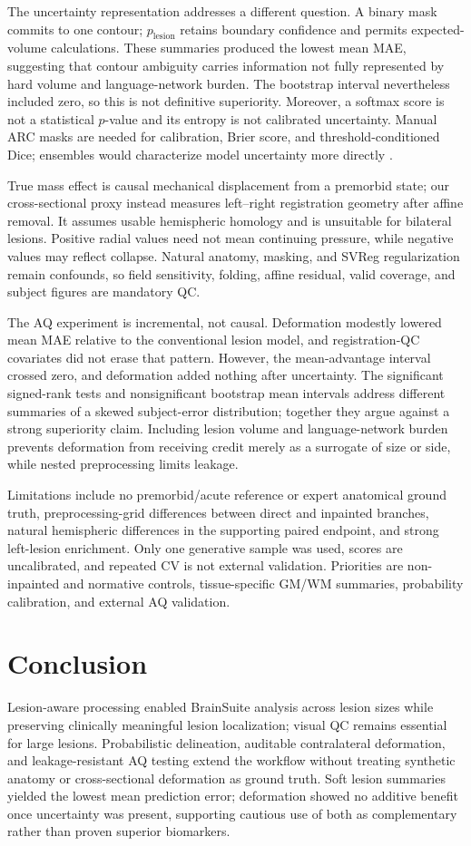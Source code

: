 \documentclass[runningheads]{llncs}
\newcommand{\plesion}{p_{\mathrm{lesion}}}
\begin{document}
The uncertainty representation addresses a different question. A binary mask
commits to one contour; $\plesion$ retains boundary confidence and permits
expected-volume calculations. These summaries produced the lowest mean MAE,
suggesting that contour ambiguity carries information not fully represented by
hard volume and language-network burden. The bootstrap interval nevertheless
included zero, so this is not definitive superiority. Moreover, a softmax score
is not a statistical $p$-value and its entropy is not calibrated uncertainty.
Manual ARC masks are needed for calibration, Brier score, and
threshold-conditioned Dice; ensembles would characterize model uncertainty
more directly \cite{Mehrtash2020}.

True mass effect is causal mechanical displacement from a premorbid state; our
cross-sectional proxy instead measures left--right registration geometry after
affine removal. It assumes usable hemispheric homology and is unsuitable for
bilateral lesions. Positive radial values need not mean continuing pressure,
while negative values may reflect collapse. Natural anatomy, masking, and SVReg
regularization remain confounds, so field sensitivity, folding, affine residual,
valid coverage, and subject figures are mandatory QC.

The AQ experiment is incremental, not causal. Deformation modestly lowered mean
MAE relative to the conventional lesion model, and registration-QC covariates
did not erase that pattern. However, the mean-advantage interval crossed zero,
and deformation added nothing after uncertainty. The significant signed-rank
tests and nonsignificant bootstrap mean intervals address different summaries
of a skewed subject-error distribution; together they argue against a strong
superiority claim. Including lesion volume and language-network burden prevents
deformation from receiving credit merely as a surrogate of size or side, while
nested preprocessing limits leakage.

Limitations include no premorbid/acute reference or expert anatomical ground
truth, preprocessing-grid differences between direct and inpainted branches,
natural hemispheric differences in the supporting paired endpoint, and strong left-lesion enrichment.
Only one generative sample was used, scores are uncalibrated, and repeated CV is
not external validation. Priorities are non-inpainted and normative controls,
tissue-specific GM/WM summaries, probability calibration, and external AQ
validation.

\section{Conclusion}
Lesion-aware processing enabled BrainSuite analysis across lesion sizes while
preserving clinically meaningful lesion localization; visual QC remains
essential for large lesions. Probabilistic delineation, auditable contralateral
deformation, and leakage-resistant AQ testing extend the workflow without
treating synthetic anatomy or cross-sectional deformation as ground truth. Soft
lesion summaries yielded the lowest mean prediction error; deformation showed
no additive benefit once uncertainty was present, supporting cautious use of
both as complementary rather than proven superior biomarkers.
\end{document}
